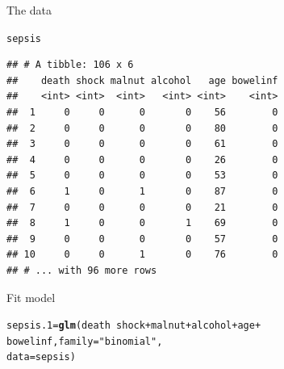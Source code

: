 \documentclass[unknownkeysallowed]{beamer}\usepackage[]{graphicx}\usepackage[]{color}
\makeatletter
\newcommand{\hlstr}[1]{\textcolor[rgb]{0.192,0.494,0.8}{#1}}%
\newcommand{\hlopt}[1]{\textcolor[rgb]{0,0,0}{#1}}%
\newcommand{\hlstd}[1]{\textcolor[rgb]{0.345,0.345,0.345}{#1}}%
\newcommand{\hlkwb}[1]{\textcolor[rgb]{0.69,0.353,0.396}{#1}}%
\newcommand{\hlkwc}[1]{\textcolor[rgb]{0.333,0.667,0.333}{#1}}%
\newcommand{\hlkwd}[1]{\textcolor[rgb]{0.737,0.353,0.396}{\textbf{#1}}}%
\newenvironment{kframe}{%
 \def\at@end@of@kframe{}%
 \ifinner\ifhmode%
  \def\at@end@of@kframe{\end{minipage}}%
  \begin{minipage}{\columnwidth}%
 \fi\fi%
 \def\FrameCommand##1{\hskip\@totalleftmargin \hskip-\fboxsep
 \colorbox{shadecolor}{##1}\hskip-\fboxsep
     \hskip-\linewidth \hskip-\@totalleftmargin \hskip\columnwidth}%
 \MakeFramed {\advance\hsize-\width
   \@totalleftmargin\z@ \linewidth\hsize
   \@setminipage}}%
 {\par\unskip\endMakeFramed%
 \at@end@of@kframe}
\newenvironment{knitrout}{}{} %
\makeatother
\begin{document}
\begin{frame}[fragile]{The data}
  
\begin{knitrout}\footnotesize
{}\color{fgcolor}\begin{kframe}
\begin{alltt}
\hlstd{sepsis}
\end{alltt}
\begin{verbatim}
## # A tibble: 106 x 6
##    death shock malnut alcohol   age bowelinf
##    <int> <int>  <int>   <int> <int>    <int>
##  1     0     0      0       0    56        0
##  2     0     0      0       0    80        0
##  3     0     0      0       0    61        0
##  4     0     0      0       0    26        0
##  5     0     0      0       0    53        0
##  6     1     0      1       0    87        0
##  7     0     0      0       0    21        0
##  8     1     0      0       1    69        0
##  9     0     0      0       0    57        0
## 10     0     0      1       0    76        0
## # ... with 96 more rows
\end{verbatim}
\end{kframe}
\end{knitrout}
  
\end{frame}

\begin{frame}[fragile]{Fit model}
  
\begin{knitrout}
\color{fgcolor}\begin{kframe}
\begin{alltt}
\hlstd{sepsis.1}\hlkwb{=}\hlkwd{glm}\hlstd{(death}\hlopt{~}\hlstd{shock}\hlopt{+}\hlstd{malnut}\hlopt{+}\hlstd{alcohol}\hlopt{+}\hlstd{age}\hlopt{+}
              \hlstd{bowelinf,}\hlkwc{family}\hlstd{=}\hlstr{"binomial"}\hlstd{,}
              \hlkwc{data}\hlstd{=sepsis)}
\end{alltt}
\end{kframe}
\end{knitrout}
  
\end{frame}
\end{document}
